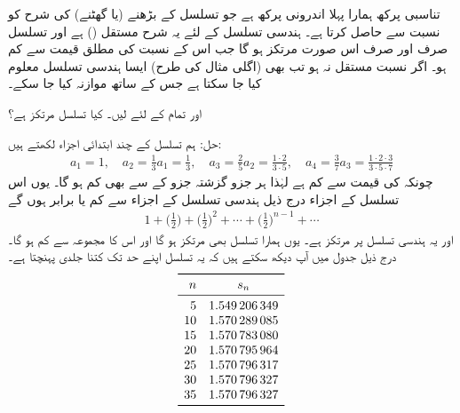 تناسبی پرکھ ہمارا پہلا اندرونی پرکھ ہے جو تسلسل کے بڑھنے (یا گھٹنے) کی شرح کو نسبت  سے حاصل کرتا ہے۔ ہندسی تسلسل  کے لئے یہ شرح مستقل () ہے اور تسلسل صرف اور صرف اس صورت مرتکز ہو گا جب اس کے نسبت کی مطلق قیمت  سے کم ہو۔ اگر نسبت مستقل نہ ہو تب بھی (اگلی مثال کی طرح) ایسا ہندسی تسلسل معلوم کیا جا سکتا ہے جس کے ساتھ موازنہ کیا جا سکے۔

 اور تمام  کے لئے  لیں۔ کیا تسلسل  مرتکز ہے؟

حل:\quad
ہم تسلسل کے چند ابتدائی اجزاء لکھتے ہیں:
\begin{align*}
a_1=1,\quad a_2=\frac{1}{3}a_1=\frac{1}{3},\quad a_3=\frac{2}{5}a_2=\frac{1\cdot 2}{3\cdot 5},\quad a_4=\frac{3}{7}a_3=\frac{1\cdot 2\cdot 3}{3\cdot 5\cdot 7}
\end{align*}
چونکہ  کی قیمت  سے کم ہے لہٰذا ہر جزو گزشتہ جزو کے  سے بھی کم ہو گا۔ یوں اس  تسلسل کے اجزاء درج ذیل ہندسی تسلسل کے اجزاء سے کم یا برابر ہوں گے
\begin{align*}
1+\big(\frac{1}{2}\big)+\big(\frac{1}{2}\big)^2+\cdots+\big(\frac{1}{2}\big)^{n-1}+\cdots
\end{align*}
 اور یہ ہندسی تسلسل  پر مرتکز ہے۔ یوں ہمارا تسلسل بھی مرتکز ہو گا اور اس کا مجموعہ  سے کم ہو گا۔درج ذیل جدول میں آپ دیکھ سکتے ہیں کہ یہ تسلسل اپنے حد  تک کتنا جلدی پہنچتا ہے۔
\begin{align*}
\begin{array}{rc}
\toprule
n&s_n\\
\midrule
5&\num{1.549206349}\\
10&\num{1.570289085}\\
15&\num{1.570783080}\\
20&\num{1.570795964}\\
25&\num{1.570796317}\\
30&\num{1.570796327}\\
35&\num{1.570796327}\\
\bottomrule
\end{array}
\end{align*}

